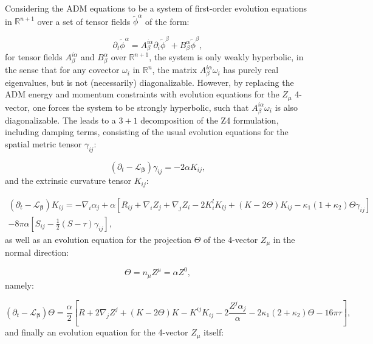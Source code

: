 \documentclass{article}
\begin{document}
Considering the ADM equations to be a system of first-order evolution equations in ${\mathbb{R}^{n + 1}}$ over a set of tensor fields ${\tilde{\phi}^{\alpha}}$ of the form:

\begin{equation}
\partial_t \tilde{\phi}^{\alpha} = A_{\beta}^{i \alpha} \partial_i \tilde{\phi}^{\beta} + B_{\beta}^{\alpha} \tilde{\phi}^{\beta},
\end{equation}
for tensor fields ${A_{\beta}^{i \alpha}}$ and ${B_{\beta}^{\alpha}}$ over ${\mathbb{R}^{n + 1}}$, the system is only weakly hyperbolic, in the sense that for any covector ${\omega_i}$ in ${\mathbb{R}^n}$, the matrix ${A_{\beta}^{i \alpha} \omega_i}$ has purely real eigenvalues, but is not (necessarily) diagonalizable\cite{reula}\cite{york}. However, by replacing the ADM energy and momentum constraints with evolution equations for the ${Z_{\mu}}$ 4-vector, one forces the system to be strongly hyperbolic, such that ${A_{\beta}^{i \alpha} \omega_i}$ is also diagonalizable. The leads to a ${3 + 1}$ decomposition of the Z4 formulation, including damping terms, consisting of the usual evolution equations for the spatial metric tensor ${\gamma_{i j}}$:

\begin{equation}
\left( \partial_t - \mathcal{L}_{\boldsymbol{\beta}} \right) \gamma_{i j} = -2 \alpha K_{i j},
\end{equation}
and the extrinsic curvature tensor ${K_{i j}}$:

\begin{multline}
\left( \partial_t - \mathcal{L}_{\boldsymbol{\beta}} \right) K_{i j} = - \nabla_i \alpha_j + \alpha \left[ R_{i j} + \nabla_i Z_j + \nabla_j Z_i - 2 K_{i}^{l} K_{l j} + \left( K - 2 \Theta \right) K_{i j} - \kappa_1 \left( 1 + \kappa_2 \right) \Theta \gamma_{i j} \right]\\
- 8 \pi \alpha \left[ S_{i j} - \frac{1}{2} \left( S - \tau \right) \gamma_{i j} \right],
\end{multline}
as well as an evolution equation for the projection ${\Theta}$ of the 4-vector ${Z_{\mu}}$ in the normal direction:

\begin{equation}
\Theta = n_{\mu} Z^{\mu} = \alpha Z^0,
\end{equation}
namely:

\begin{equation}
\left( \partial_t - \mathcal{L}_{\boldsymbol{\beta}} \right) \Theta = \frac{\alpha}{2} \left[ R + 2 \nabla_j Z^j + \left( K - 2 \Theta \right) K - K^{i j} K_{i j} - 2 \frac{Z^j \alpha_j}{\alpha} - 2 \kappa_1 \left( 2 + \kappa_2 \right) \Theta - 16 \pi \tau \right],
\end{equation}
and finally an evolution equation for the 4-vector ${Z_{\mu}}$ itself:
\end{document}
